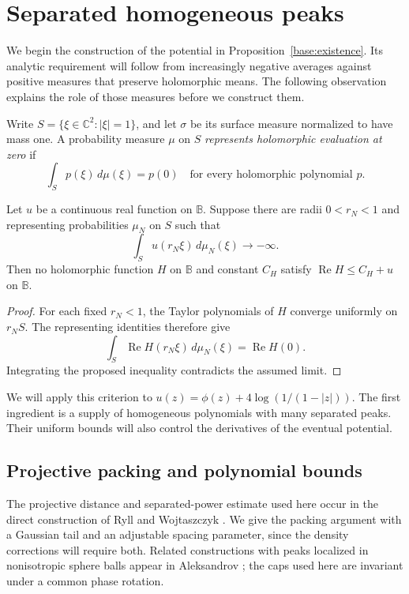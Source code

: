 \section{Separated homogeneous peaks}\label{sec:peaks}

We begin the construction of the potential in
Proposition~\ref{base:existence}.  Its analytic requirement will follow
from increasingly negative averages against positive measures that
preserve holomorphic means.  The following observation explains the
role of those measures before we construct them.

Write $S=\{\xi\in\mathbb C^2:|\xi|=1\}$, and let $\sigma$ be its
surface measure normalized to have mass one.  A probability measure
$\mu$ on $S$ \emph{represents holomorphic evaluation at zero} if
\[
 \int_S p(\xi)\,d\mu(\xi)=p(0)
 \quad\text{for every holomorphic polynomial }p.
\]

\begin{lemma}\label{peaks:mean-criterion}
Let $u$ be a continuous real function on $\mathbb B$.  Suppose there
are radii $0<r_N<1$ and representing probabilities $\mu_N$ on $S$
such that
\[
 \int_S u(r_N\xi)\,d\mu_N(\xi)\longrightarrow-\infty.
\]
Then no holomorphic function $H$ on $\mathbb B$ and constant $C_H$
satisfy $\operatorname{Re}H\le C_H+u$ on $\mathbb B$.
\end{lemma}

\begin{proof}
For each fixed $r_N<1$, the Taylor polynomials of $H$ converge
uniformly on $r_NS$.  The representing identities therefore give
\[
 \int_S\operatorname{Re}H(r_N\xi)\,d\mu_N(\xi)
 =\operatorname{Re}H(0).
\]
Integrating the proposed inequality contradicts the assumed limit.
\end{proof}

We will apply this criterion to
$u(z)=\phi(z)+4\log(1/(1-|z|))$.  The first ingredient is a supply
of homogeneous polynomials with many separated peaks.  Their uniform
bounds will also control the derivatives of the eventual potential.

\subsection{Projective packing and polynomial bounds}

The projective distance and separated-power estimate used here occur
in the direct construction of Ryll and Wojtaszczyk
\cite[p.~112 and Lemma~2.7]{RyllWojtaszczyk1983}.
We give the packing argument with a Gaussian tail and an adjustable
spacing parameter, since the density corrections will require both.
Related constructions with peaks localized in nonisotropic sphere
balls appear in Aleksandrov \cite[Lemmas~2--3]{Aleksandrov1983};
the caps used here are invariant under a common phase rotation.

